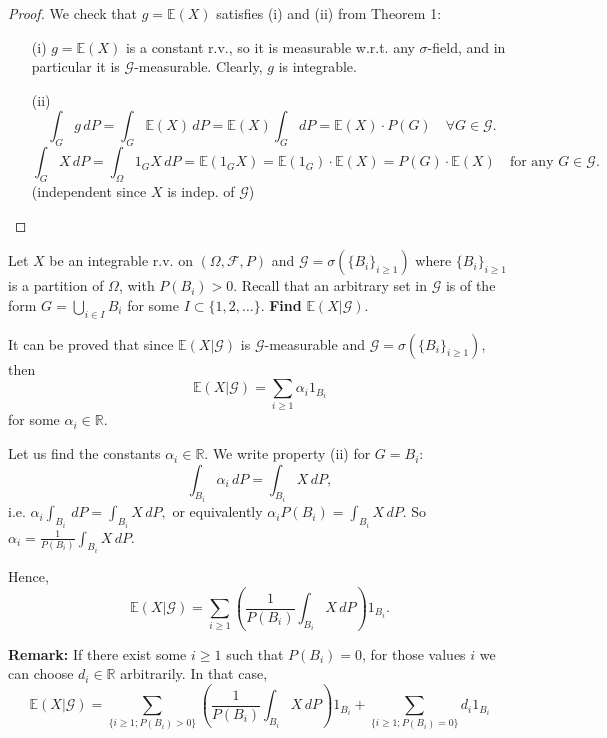 \begin{proof}
    We check that \(g = \mathbb{E}(X)\) satisfies (i) and (ii) from Theorem 1:
\begin{itemize}
    \item[(i)] \(g = \mathbb{E}(X)\) is a constant r.v., so it is measurable w.r.t. any \(\sigma\)-field, and in particular it is \(\mathcal{G}\)-measurable. Clearly, \(g\) is integrable.
    \item[(ii)] 
    \[
    \int_G g \, dP = \int_G \mathbb{E}(X) \, dP = \mathbb{E}(X) \int_G dP = \mathbb{E}(X) \cdot P(G) \quad \forall G \in \mathcal{G}.
    \]
    \[
    \int_G X \, dP = \int_\Omega 1_G X \, dP = \mathbb{E}(1_G X) = \mathbb{E}(1_G) \cdot \mathbb{E}(X) = P(G) \cdot \mathbb{E}(X) \quad \text{for any } G \in \mathcal{G}.
    \]
    (independent since \(X\) is indep. of \(\mathcal{G}\))
\end{itemize}
\end{proof}
\begin{example}
Let \( X \) be an integrable r.v. on \( (\Omega, \mathcal{F}, P) \) and \(\mathcal{G} = \sigma(\{ B_i \}_{i \geq 1}) \) where \( \{ B_i \}_{i \geq 1} \) is a partition of \(\Omega\), with \( P(B_i) > 0 \). Recall that an arbitrary set in \(\mathcal{G}\) is of the form \( G = \bigcup_{i \in I} B_i \) for some \( I \subset \{ 1, 2, \ldots \} \).
\textbf{Find} \( \mathbb{E}(X|\mathcal{G}) \).

It can be proved that since \( \mathbb{E}(X|\mathcal{G}) \) is \(\mathcal{G}\)-measurable and \( \mathcal{G} = \sigma(\{ B_i \}_{i \geq 1}) \), then 
\[ \mathbb{E}(X|\mathcal{G}) = \sum_{i \geq 1} \alpha_i 1_{B_i} \]
for some \( \alpha_i \in \mathbb{R} \).

Let us find the constants \( \alpha_i \in \mathbb{R} \). We write property (ii) for \( G = B_i \):
\[ \int_{B_i} \alpha_i \, dP = \int_{B_i} X \, dP, \]
i.e. \( \alpha_i \int_{B_i} \, dP = \int_{B_i} X \, dP, \)
or equivalently \( \alpha_i P(B_i) = \int_{B_i} X \, dP \). So \( \alpha_i = \frac{1}{P(B_i)} \int_{B_i} X \, dP \).

Hence,
\[ \mathbb{E}(X|\mathcal{G}) = \sum_{i \geq 1} \left( \frac{1}{P(B_i)} \int_{B_i} X \, dP \right) 1_{B_i}. \]

\end{example}

\textbf{Remark:} If there exist some \( i \geq 1 \) such that \( P(B_i) = 0 \), for those values \( i \) we can choose \( d_i \in \mathbb{R} \) arbitrarily. In that case,
\[ \mathbb{E}(X|\mathcal{G}) = \sum_{\{i \geq 1; P(B_i) > 0\}} \left( \frac{1}{P(B_i)} \int_{B_i} X \, dP \right) 1_{B_i} + \sum_{\{i \geq 1; P(B_i) = 0\}} d_i 1_{B_i} \]

